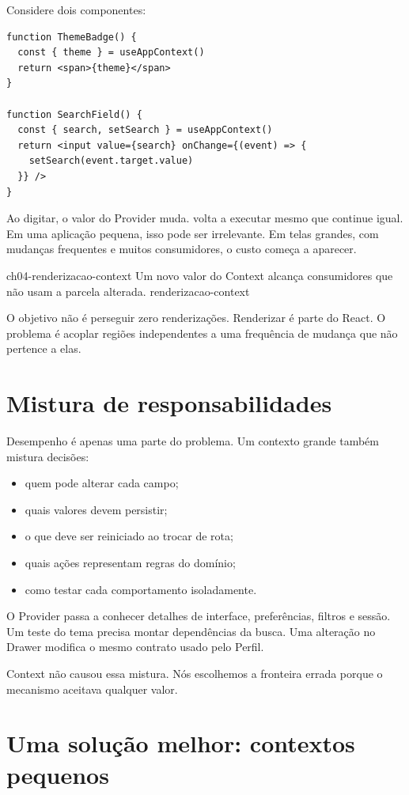 Considere dois componentes:

\begin{lstlisting}
function ThemeBadge() {
  const { theme } = useAppContext()
  return <span>{theme}</span>
}

function SearchField() {
  const { search, setSearch } = useAppContext()
  return <input value={search} onChange={(event) => {
    setSearch(event.target.value)
  }} />
}
\end{lstlisting}

Ao digitar, o valor do Provider muda.  volta a executar mesmo
que  continue igual. Em uma aplicação pequena, isso pode ser
irrelevante. Em telas grandes, com mudanças frequentes e muitos consumidores, o
custo começa a aparecer.

\imagemcapitulo
  {ch04-renderizacao-context}
  {Um novo valor do Context alcança consumidores que não usam a parcela alterada.}
  {renderizacao-context}

O objetivo não é perseguir zero renderizações. Renderizar é parte do React. O
problema é acoplar regiões independentes a uma frequência de mudança que não
pertence a elas.

\section{Mistura de responsabilidades}

Desempenho é apenas uma parte do problema. Um contexto grande também mistura
decisões:

\begin{itemize}
  \item quem pode alterar cada campo;
  \item quais valores devem persistir;
  \item o que deve ser reiniciado ao trocar de rota;
  \item quais ações representam regras do domínio;
  \item como testar cada comportamento isoladamente.
\end{itemize}

O Provider passa a conhecer detalhes de interface, preferências, filtros e
sessão. Um teste do tema precisa montar dependências da busca. Uma alteração no
Drawer modifica o mesmo contrato usado pelo Perfil.

Context não causou essa mistura. Nós escolhemos a fronteira errada porque o
mecanismo aceitava qualquer valor.

\section{Uma solução melhor: contextos pequenos}

